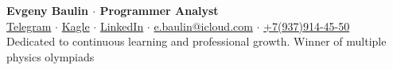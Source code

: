 \begin{center}
    \LARGE\textbf{Evgeny Baulin $\cdot$ Programmer Analyst \textit{}}\\
    \normalsize\href{https://t.me/tarakan_tuc}{Telegram} $\cdot$
    \normalsize\href{https://www.kaggle.com/evgeny1928}{Kagle} $\cdot$
    \normalsize\href{https://www.linkedin.com/in/evgeny-baulin/}{LinkedIn} $\cdot$ \href{mailto:e.baulin@icloud.com}{e.baulin@icloud.com} $\cdot$ \href{tel:+79379144550}{+7(937)914-45-50}\\
    Dedicated to continuous learning and professional growth. Winner of multiple physics olympiads\\
    \hrulefill
\end{center}